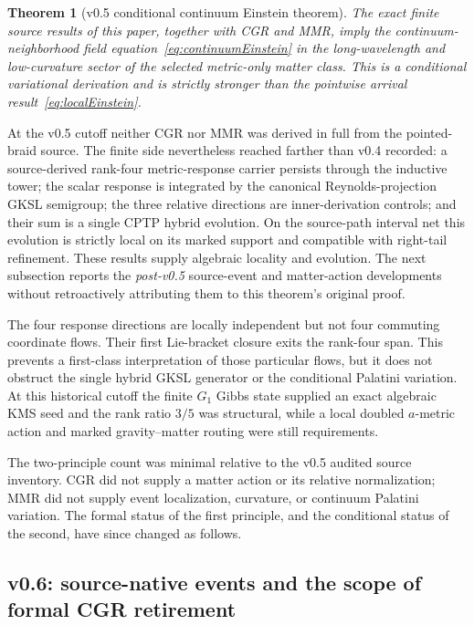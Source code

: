 \documentclass[11pt]{article}
\newtheorem{theorem}{Theorem}[section]
\theoremstyle{definition}
\theoremstyle{remark}
\begin{document}
\begin{theorem}[v0.5 conditional continuum Einstein theorem]\label{thm:conditionalEinstein}
The exact finite source results of this paper, together with CGR and MMR, imply the continuum-neighborhood field equation~\eqref{eq:continuumEinstein} in the long-wavelength and low-curvature sector of the selected metric-only matter class. This is a conditional variational derivation and is strictly stronger than the pointwise arrival result~\eqref{eq:localEinstein}.
\end{theorem}

At the v0.5 cutoff neither CGR nor MMR was derived in full from the pointed-braid source. The finite side nevertheless reached farther than v0.4 recorded: a source-derived rank-four metric-response carrier persists through the inductive tower; the scalar response is integrated by the canonical Reynolds-projection GKSL semigroup; the three relative directions are inner-derivation controls; and their sum is a single CPTP hybrid evolution. On the source-path interval net this evolution is strictly local on its marked support and compatible with right-tail refinement. These results supply algebraic locality and evolution. The next subsection reports the \emph{post-v0.5} source-event and matter-action developments without retroactively attributing them to this theorem's original proof.

The four response directions are locally independent but not four commuting coordinate flows. Their first Lie-bracket closure exits the rank-four span. This prevents a first-class interpretation of those particular flows, but it does not obstruct the single hybrid GKSL generator or the conditional Palatini variation. At this historical cutoff the finite $G_1$ Gibbs state supplied an exact algebraic KMS seed and the rank ratio $3/5$ was structural, while a local doubled $a$-metric action and marked gravity--matter routing were still requirements.

The two-principle count was minimal relative to the v0.5 audited source inventory. CGR did not supply a matter action or its relative normalization; MMR did not supply event localization, curvature, or continuum Palatini variation. The formal status of the first principle, and the conditional status of the second, have since changed as follows.

\subsection{v0.6: source-native events and the scope of formal CGR retirement}\label{sec:v06events}
\end{document}
